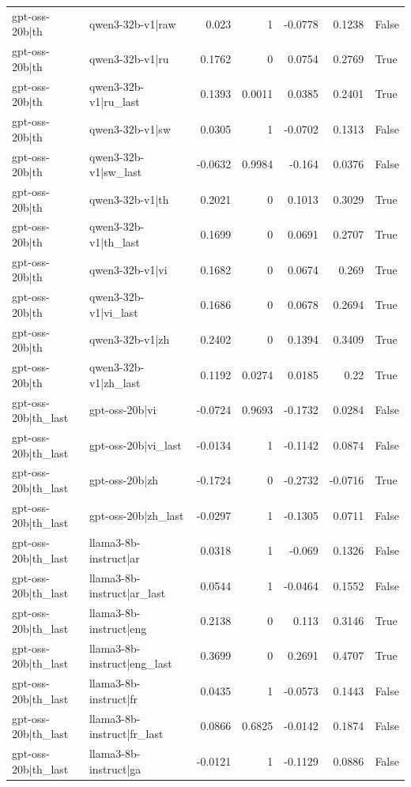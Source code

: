 \begin{table}
\begin{tabular}{l l r r r r l}
gpt-oss-20b|th & qwen3-32b-v1|raw & 0.023 & 1 & -0.0778 & 0.1238 & False \\
gpt-oss-20b|th & qwen3-32b-v1|ru & 0.1762 & 0 & 0.0754 & 0.2769 & True \\
gpt-oss-20b|th & qwen3-32b-v1|ru_last & 0.1393 & 0.0011 & 0.0385 & 0.2401 & True \\
gpt-oss-20b|th & qwen3-32b-v1|sw & 0.0305 & 1 & -0.0702 & 0.1313 & False \\
gpt-oss-20b|th & qwen3-32b-v1|sw_last & -0.0632 & 0.9984 & -0.164 & 0.0376 & False \\
gpt-oss-20b|th & qwen3-32b-v1|th & 0.2021 & 0 & 0.1013 & 0.3029 & True \\
gpt-oss-20b|th & qwen3-32b-v1|th_last & 0.1699 & 0 & 0.0691 & 0.2707 & True \\
gpt-oss-20b|th & qwen3-32b-v1|vi & 0.1682 & 0 & 0.0674 & 0.269 & True \\
gpt-oss-20b|th & qwen3-32b-v1|vi_last & 0.1686 & 0 & 0.0678 & 0.2694 & True \\
gpt-oss-20b|th & qwen3-32b-v1|zh & 0.2402 & 0 & 0.1394 & 0.3409 & True \\
gpt-oss-20b|th & qwen3-32b-v1|zh_last & 0.1192 & 0.0274 & 0.0185 & 0.22 & True \\
gpt-oss-20b|th_last & gpt-oss-20b|vi & -0.0724 & 0.9693 & -0.1732 & 0.0284 & False \\
gpt-oss-20b|th_last & gpt-oss-20b|vi_last & -0.0134 & 1 & -0.1142 & 0.0874 & False \\
gpt-oss-20b|th_last & gpt-oss-20b|zh & -0.1724 & 0 & -0.2732 & -0.0716 & True \\
gpt-oss-20b|th_last & gpt-oss-20b|zh_last & -0.0297 & 1 & -0.1305 & 0.0711 & False \\
gpt-oss-20b|th_last & llama3-8b-instruct|ar & 0.0318 & 1 & -0.069 & 0.1326 & False \\
gpt-oss-20b|th_last & llama3-8b-instruct|ar_last & 0.0544 & 1 & -0.0464 & 0.1552 & False \\
gpt-oss-20b|th_last & llama3-8b-instruct|eng & 0.2138 & 0 & 0.113 & 0.3146 & True \\
gpt-oss-20b|th_last & llama3-8b-instruct|eng_last & 0.3699 & 0 & 0.2691 & 0.4707 & True \\
gpt-oss-20b|th_last & llama3-8b-instruct|fr & 0.0435 & 1 & -0.0573 & 0.1443 & False \\
gpt-oss-20b|th_last & llama3-8b-instruct|fr_last & 0.0866 & 0.6825 & -0.0142 & 0.1874 & False \\
gpt-oss-20b|th_last & llama3-8b-instruct|ga & -0.0121 & 1 & -0.1129 & 0.0886 & False \\

\end{tabular}
\end{table}

